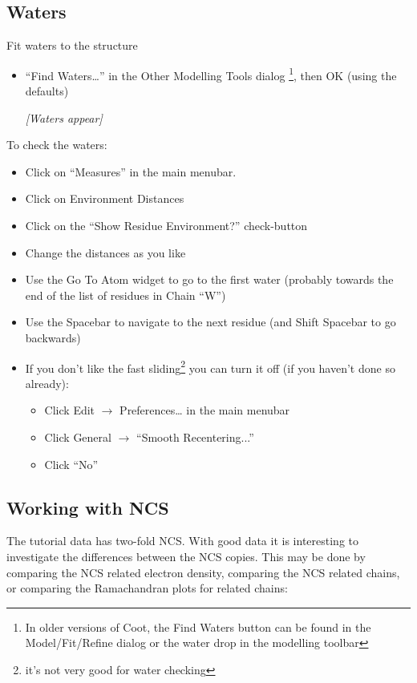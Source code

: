 \documentclass{article}
\begin{document}
\subsection{Waters}
Fit waters to the structure
\begin{itemize}
\item \textsf{``Find Waters\ldots''} in the Other Modelling Tools
  dialog \footnote{In older versions of Coot, the Find Waters button
    can be found in the Model/Fit/Refine dialog or the water drop in
    the modelling toolbar}, then OK (using the defaults)

\textsl{ [Waters appear]}

\end{itemize}
To check the waters:
\begin{itemize}
\item Click on \textsf{``Measures''} in the main menubar.  
\item Click on \textsf{Environment Distances}
\item Click on the \textsf{``Show Residue Environment?''} check-button
\item Change the distances as you like
\item Use the Go To Atom widget to go to the first water (probably
  towards the end of the list of residues in Chain ``W'')
\item Use the Spacebar to navigate to the next residue (and Shift
  Spacebar to go backwards)
\item If you don't like the fast sliding\footnote{it's not very good
    for water checking} you can turn it off (if you haven't done so already):
  \begin{itemize}
  \item Click \textsf{Edit $\rightarrow$ Preferences\ldots} in the main menubar
  \item Click \textsf{General $\rightarrow$ ``Smooth Recentering...''}
  \item Click \textsf{``No''}
  \end{itemize}
\end{itemize}


\subsection{Working with NCS}

The tutorial data has two-fold NCS. With good data it is interesting
to investigate the differences between the NCS copies. This may be
done by comparing the NCS related electron density, comparing the NCS
related chains, or comparing the Ramachandran plots for related chains:
\end{document}
